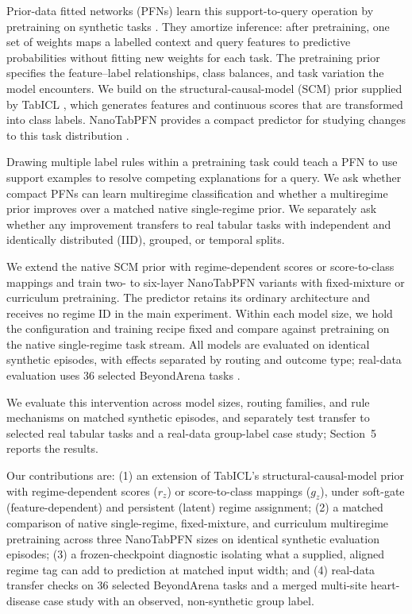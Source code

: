 \documentclass{article}
\begin{document}
Prior-data fitted networks (PFNs) learn this support-to-query operation by pretraining on synthetic tasks \citep{muller2022pfn,hollmann2023tabpfn}. They amortize inference: after pretraining, one set of weights maps a labelled context and query features to predictive probabilities without fitting new weights for each task. The pretraining prior specifies the feature--label relationships, class balances, and task variation the model encounters. We build on the structural-causal-model (SCM) prior supplied by TabICL \citep{qu2025tabicl}, which generates features and continuous scores that are transformed into class labels. NanoTabPFN provides a compact predictor for studying changes to this task distribution \citep{pfefferle2025nanotabpfn}.

Drawing multiple label rules within a pretraining task could teach a PFN to use support examples to resolve competing explanations for a query. We ask whether compact PFNs can learn multiregime classification and whether a multiregime prior improves over a matched native single-regime prior. We separately ask whether any improvement transfers to real tabular tasks with independent and identically distributed (IID), grouped, or temporal splits.

We extend the native SCM prior with regime-dependent scores or score-to-class mappings and train two- to six-layer NanoTabPFN variants with fixed-mixture or curriculum pretraining. The predictor retains its ordinary architecture and receives no regime ID in the main experiment. Within each model size, we hold the configuration and training recipe fixed and compare against pretraining on the native single-regime task stream. All models are evaluated on identical synthetic episodes, with effects separated by routing and outcome type; real-data evaluation uses 36 selected BeyondArena tasks \citep{purucker2026beyondarena}.

We evaluate this intervention across model sizes, routing families, and rule mechanisms on matched synthetic episodes, and separately test transfer to selected real tabular tasks and a real-data group-label case study; Section~5 reports the results.

Our contributions are: (1) an extension of TabICL's structural-causal-model prior with regime-dependent scores ($r_z$) or score-to-class mappings ($g_z$), under soft-gate (feature-dependent) and persistent (latent) regime assignment; (2) a matched comparison of native single-regime, fixed-mixture, and curriculum multiregime pretraining across three NanoTabPFN sizes on identical synthetic evaluation episodes; (3) a frozen-checkpoint diagnostic isolating what a supplied, aligned regime tag can add to prediction at matched input width; and (4) real-data transfer checks on 36 selected BeyondArena tasks and a merged multi-site heart-disease case study with an observed, non-synthetic group label.
\end{document}
